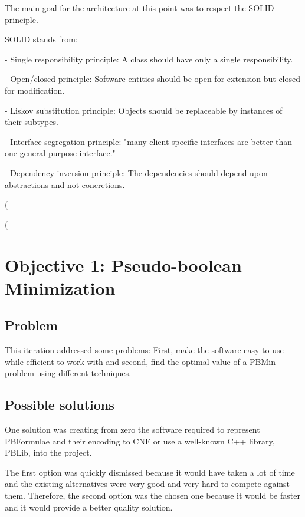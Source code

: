 The main goal for the architecture at this point was to respect the SOLID principle.  

SOLID stands from: 

- Single responsibility principle: A class should have only a single responsibility.  

- Open/closed principle: Software entities should be open for extension but closed for modification. 

- Liskov substitution principle: Objects should be replaceable by instances of their subtypes.  

- Interface segregation principle: "many client-specific interfaces are better than one general-purpose interface." %

- Dependency inversion principle: The dependencies should depend upon abstractions and not concretions.  



(%

(%


\section{Objective 1: Pseudo-boolean Minimization}

\subsection{Problem}
This iteration addressed some problems: First, make the software easy to use while efficient to work with and second, find the optimal value of a PBMin problem using different techniques.  

\subsection{Possible solutions}
One solution was creating from zero the software required to represent PBFormulae and their encoding to CNF or use a well-known C++ library, PBLib, into the project. 

The first option was quickly dismissed because it would have taken a lot of time and the existing alternatives were very good and very hard to compete against them. Therefore, the second option was the chosen one because it would be faster and it would provide a better quality solution. 



